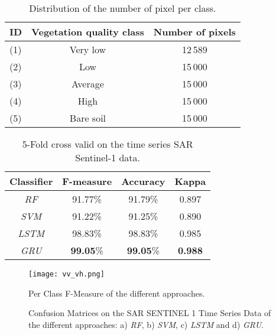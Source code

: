 \documentclass[journal, onecolumn]{IEEEtran}
\begin{document}
\begin{table}[tp]
\centering
\begin{tabular}{|l|c|c|} \hline
\textbf{ID} & \textbf{Vegetation quality class} & {Number of pixels} \\ \hline
(1) & Very low & 12\,589 \\ \hline
(2) & Low & 15\,000 \\ \hline
(3) & Average & 15\,000 \\ \hline
(4) & High & 15\,000 \\ \hline
(5) & Bare soil & 15\,000 \\ \hline
\end{tabular}
\caption{Distribution of the number of pixel per class. \label{Table:occSolDistrib}}

\end{table}



\begin{table}[tp]
\centering
\begin{tabular}{|c|c|c|c|}
\hline 
Classifier & F-measure & Accuracy & Kappa\tabularnewline
\hline 
\hline 
\textit{RF} & 91.77\% & 91.79\% & 0.897 \\
\hline 
\textit{SVM} & 91.22\% & 91.25\% & 0.890 \\
\hline 
\textit{LSTM} & 98.83\% & 98.83\% & 0.985\\
\hline 
\textit{GRU} & \textbf{99.05}\% & \textbf{99.05}\% & \textbf{0.988} \\
\hline 
\end{tabular}
\caption{5-Fold cross valid on the time series SAR Sentinel-1 data. \label{Table:VHVV}
}
\end{table}


\begin{figure}[!ht]
\centering
\texttt{[image: vv\_vh.png]}
\caption{Per Class F-Measure of the different approaches. 
\label{fig:perClassF}}
\end{figure}


\begin{figure}[!ht]
\centering
{}
\caption{ Confusion Matrices on the SAR SENTINEL 1 Time Series Data of the different approaches: a) \textit{RF}, b) \textit{SVM}, c) \textit{LSTM} and d) \textit{GRU}. \label{fig:ContiTables} }
\end{figure}
\end{document}
